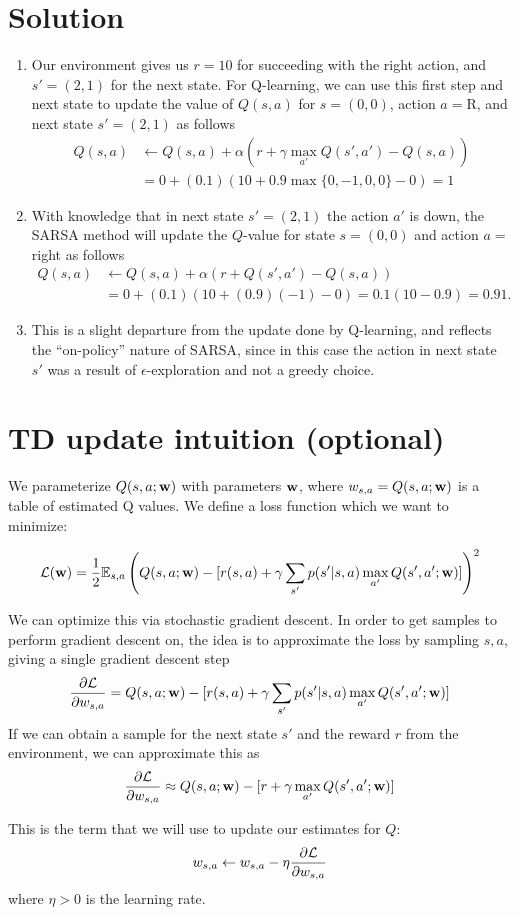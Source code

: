 \documentclass[11pt, letterpaper]{article}
\newenvironment{solution}
  {\color{blue}\section*{Solution}}
{}
\begin{document}
\vspace{0.5pc}

\begin{solution}
 
\begin{enumerate}
\item Our environment gives us $r = 10$ for succeeding with the right
  action, and $s' = (2,1)$ for the next state.
%
  For Q-learning, we can use this first step
  and next state to update the value of $Q(s,a)$ for $s=(0,0)$,
action   $a=\text{R}$, and next state $s'=(2,1)$  as follows
%
\begin{align}
  Q(s,a)&\leftarrow Q(s,a)+\alpha(r+\gamma\max_{a'}Q(s',a')-Q(s,a))
  \\
        &=0 + (0.1)(10+0.9\max\{0,-1,0,0\}-0) = 1
\end{align}

\item With knowledge that in next 
  state $s'=(2,1)$ the action $a'$ is down, the SARSA method will
  update the $Q$-value for state $s=(0,0)$ and action $a=$ right as follows
  \begin{align}
    Q(s,a)&\leftarrow Q(s,a)+\alpha(r+Q(s',a')-Q(s,a))\\
    &=0+(0.1)(10+(0.9)(-1)-0)=0.1(10-0.9)=0.91.
  \end{align}

  \item 
  This is a slight departure from the update done by Q-learning, and
  reflects the ``on-policy'' nature of SARSA, since in this case the
  action in next state $s'$ was a result of $\epsilon$-exploration and
  not a greedy choice.
\end{enumerate}
\end{solution}

\section{TD update intuition (optional)}

We parameterize $Q(s,a; \mathbf{w})$ with parameters $\mathbf{w}$, where $w_{s,a} = Q(s,a;\mathbf{w})$ is a table of estimated Q values. We define a loss function which we want to minimize:

\begin{align}
\mathcal{L}(\mathbf{w}) = \frac{1}{2}\mathbb{E}_{s,a}\left( Q(s,a; \mathbf{w}) - [r(s,a) + \gamma\sum_{s'}p(s'|s, a)\max_{a'}Q(s', a'; \mathbf{w})
]\right)^2
\end{align}

We can optimize this via stochastic gradient descent. In order to get samples to perform gradient descent on, the idea is to approximate the loss by sampling $s,a$, giving a single gradient descent step
\begin{align}\frac{\partial \mathcal{L}}{\partial w_{s,a}} = Q(s,a;\mathbf{w}) - [r(s,a) + \gamma \sum_{s'}p(s'|s, a)\max_{a'}Q(s', a'; \mathbf{w})]\end{align}
If we can obtain a sample for the next state $s'$ and the reward $r$ from the environment, we can approximate this as
\begin{align}\frac{\partial \mathcal{L}}{\partial w_{s,a}} \approx Q(s,a;\mathbf{w}) - [r + \gamma \max_{a'}Q(s', a'; \mathbf{w})]\end{align}

This is the term that we will use to update our estimates for $Q$:
\begin{align}
    w_{s,a} \leftarrow w_{s,a} - \eta\frac{\partial \mathcal{L}}{\partial w_{s,a}}
\end{align}
where $\eta>0$ is the learning rate.
\end{document}
